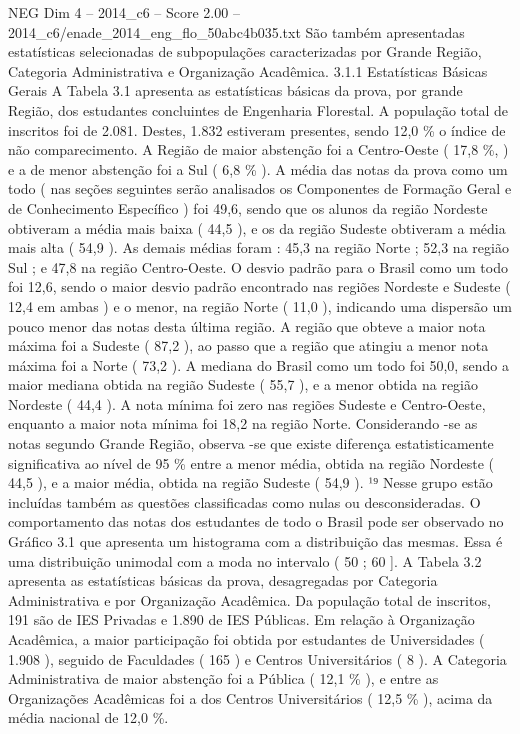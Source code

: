 \begin{textsample}{NEG Dim 4 – 2014\_c6 – Score 2.00 – 2014\_c6/enade\_2014\_eng\_flo\_50abc4b035.txt}
São também apresentadas estatísticas selecionadas de subpopulações caracterizadas por Grande Região, Categoria Administrativa e Organização Acadêmica. 3.1.1 Estatísticas Básicas Gerais A Tabela 3.1 apresenta as estatísticas básicas da prova, por grande Região, dos estudantes concluintes de Engenharia Florestal.
A população total de inscritos foi de 2.081.
Destes, 1.832 estiveram presentes, sendo 12,0 \% o índice de não comparecimento.
A Região de maior abstenção foi a Centro-Oeste ( 17,8 \%, ) e a de menor abstenção foi a Sul ( 6,8 \% ).
A média das notas da prova como um todo ( nas seções seguintes serão analisados os Componentes de Formação Geral e de Conhecimento Específico ) foi 49,6, sendo que os alunos da região Nordeste obtiveram a média mais baixa ( 44,5 ), e os da região Sudeste obtiveram a média mais alta ( 54,9 ).
As demais médias foram : 45,3 na região Norte ; 52,3 na região Sul ; e 47,8 na região Centro-Oeste.
O desvio padrão para o Brasil como um todo foi 12,6, sendo o maior desvio padrão encontrado nas regiões Nordeste e Sudeste ( 12,4 em ambas ) e o menor, na região Norte ( 11,0 ), indicando uma dispersão um pouco menor das notas desta última região.
A região que obteve a maior nota máxima foi a Sudeste ( 87,2 ), ao passo que a região que atingiu a menor nota máxima foi a Norte ( 73,2 ).
A mediana do Brasil como um todo foi 50,0, sendo a maior mediana obtida na região Sudeste ( 55,7 ), e a menor obtida na região Nordeste ( 44,4 ).
A nota mínima foi zero nas regiões Sudeste e Centro-Oeste, enquanto a maior nota mínima foi 18,2 na região Norte.
Considerando -se as notas segundo Grande Região, observa -se que existe diferença estatisticamente significativa ao nível de 95 \% entre a menor média, obtida na região Nordeste ( 44,5 ), e a maior média, obtida na região Sudeste ( 54,9 ). ¹⁹ Nesse grupo estão incluídas também as questões classificadas como nulas ou desconsideradas.
O comportamento das notas dos estudantes de todo o Brasil pode ser observado no Gráfico 3.1 que apresenta um histograma com a distribuição das mesmas.
Essa é uma distribuição unimodal com a moda no intervalo ( 50 ; 60 ].
A Tabela 3.2 apresenta as estatísticas básicas da prova, desagregadas por Categoria Administrativa e por Organização Acadêmica.
Da população total de inscritos, 191 são de IES Privadas e 1.890 de IES Públicas.
Em relação à Organização Acadêmica, a maior participação foi obtida por estudantes de Universidades ( 1.908 ), seguido de Faculdades ( 165 ) e Centros Universitários ( 8 ).
A Categoria Administrativa de maior abstenção foi a Pública ( 12,1 \% ), e entre as Organizações Acadêmicas foi a dos Centros Universitários ( 12,5 \% ), acima da média nacional de 12,0 \%.

\end{textsample}
